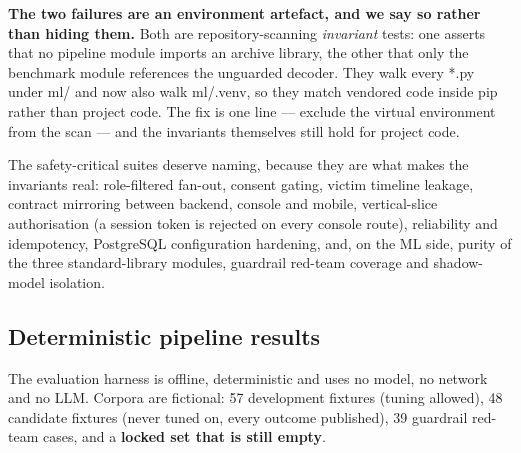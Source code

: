 \documentclass[11pt,a4paper]{article}
\newcommand{\codeus}{\textunderscore\allowbreak}
\DeclareRobustCommand{\code}[1]{{\ttfamily\let\_\codeus #1}}
\begin{document}
\noindent\textbf{The two failures are an environment artefact, and we say so rather than hiding
them.} Both are repository-scanning \emph{invariant} tests: one asserts that no pipeline module
imports an archive library, the other that only the benchmark module references the unguarded
decoder. They walk every \code{*.py} under \code{ml/} and now also walk \code{ml/.venv}, so they
match vendored code inside \code{pip} rather than project code. The fix is one line --- exclude the
virtual environment from the scan --- and the invariants themselves still hold for project code.

\noindent The safety-critical suites deserve naming, because they are what makes the invariants real:
role-filtered fan-out, consent gating, victim timeline leakage, contract mirroring between backend,
console and mobile, vertical-slice authorisation (a session token is rejected on every console
route), reliability and idempotency, PostgreSQL configuration hardening, and, on the ML side, purity
of the three standard-library modules, guardrail red-team coverage and shadow-model isolation.

\subsection{Deterministic pipeline results}
\label{sec:detres}
The evaluation harness is offline, deterministic and uses no model, no network and no LLM. Corpora
are fictional: 57 development fixtures (tuning allowed), 48 candidate fixtures (never tuned on, every
outcome published), 39 guardrail red-team cases, and a \textbf{locked set that is still empty}.
\end{document}
